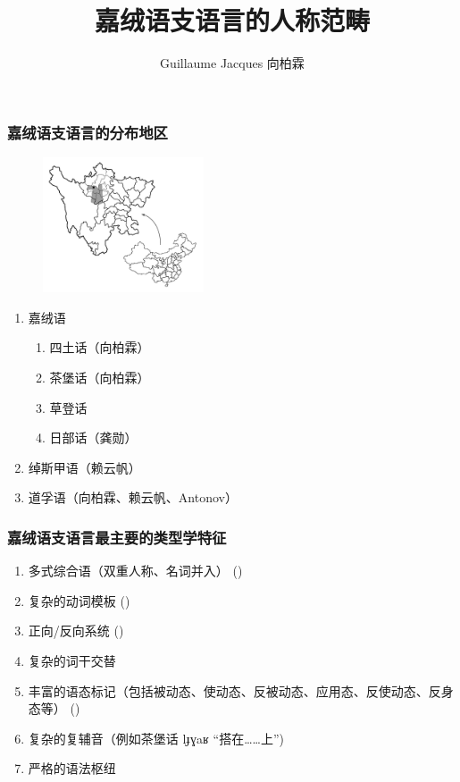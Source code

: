\documentclass[xcolor=table]{beamer}
\newcommand{\ipa}[1]{{\phon \mbox{#1}}} %
\begin{document}
 \title{嘉绒语支语言的人称范畴}
 \author{Guillaume Jacques  向柏霖}
 \maketitle
  
    \begin{frame} 
 \frametitle{嘉绒语支语言的分布地区} 
 \begin{figure}[H]
\centering
\includegraphics[height=40mm]{carte.JPG}
\end{figure}
  \begin{enumerate}%
    \item 嘉绒语
    \begin{enumerate}
 \item 四土话（向柏霖）
 \item 茶堡话（向柏霖）
  \item 草登话
 \item 日部话（龚勋）
  \end{enumerate}
  \item 绰斯甲语（赖云帆）
    \item 道孚语（向柏霖、赖云帆、Antonov）
 \end{enumerate}
  \end{frame}
  
  
     
    \begin{frame} 
 \frametitle{嘉绒语支语言最主要的类型学特征}  
 
 \begin{enumerate}%
 \item 多式综合语（双重人称、名词并入） (\citealt{jacques12incorp})
 \item 复杂的动词模板 (\citealt{jacques13harmonization, lai13affixale})
  \item 正向/反向系统 (\citealt{jackson02rentongdengdi, jacques10inverse, gongxun14agreement, lai14person})
 \item 复杂的词干交替
 \item 丰富的语态标记（包括被动态、使动态、反被动态、应用态、反使动态、反身态等） (\citealt{lai13affixale, jacques14antipassive})
 \item 复杂的复辅音（例如茶堡话 \ipa{lɟɣaʁ} “搭在……上”)
 \item  严格的语法枢纽
 \end{enumerate}
   
  \end{frame}   
  
\end{document}
